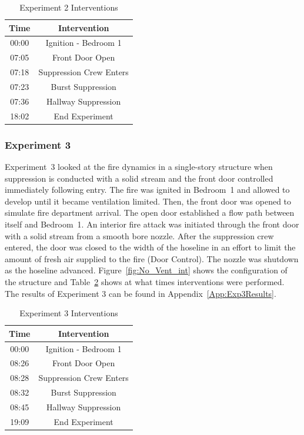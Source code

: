 \documentclass[12pt,oneside]{book}
\begin{document}

\begin{table}[!ht]
	\centering
	\caption{Experiment 2 Interventions}
	\begin{tabular}{|c|c|} 
		\hline
		Time & Intervention \\ \hline \hline
		00:00 & Ignition - Bedroom 1 \\ \hline
		07:05 & Front Door Open \\ \hline
		07:18 & Suppression Crew Enters\\ \hline
		07:23 & Burst Suppression \\ \hline 
		07:36 & Hallway Suppression \\ \hline
		18:02 & End Experiment\\ \hline
	\end{tabular}
	\label{Table:Exp2Interventions}
\end{table}

\FloatBarrier

\subsubsection{Experiment 3}
Experiment~3 looked at the fire dynamics in a single-story structure when suppression is conducted with a solid stream and the front door controlled immediately following entry. The fire was ignited in Bedroom~1 and allowed to develop until it became ventilation limited. Then, the front door was opened to simulate fire department arrival. The open door established a flow path between itself and Bedroom~1. An interior fire attack was initiated through the front door with a solid stream from a smooth bore nozzle. After the suppression crew entered, the door was closed to the width of the hoseline in an effort to limit the amount of fresh air supplied to the fire (Door Control). The nozzle was shutdown as the hoseline advanced. Figure~\ref{fig:No_Vent_int} shows the configuration of the structure and Table~\ref{Table:Exp3Interventions} shows at what times interventions were performed. The results of Experiment 3 can be found in Appendix~\ref{App:Exp3Results}.


\begin{table}[!ht]
	\centering
	\caption{Experiment 3 Interventions}
	\begin{tabular}{|c|c|} 
		\hline
		Time & Intervention \\ \hline \hline
		00:00 & Ignition - Bedroom 1 \\ \hline
		08:26 & Front Door Open \\ \hline
		08:28 & Suppression Crew Enters\\ \hline
		08:32 & Burst Suppression \\ \hline 
		08:45 & Hallway Suppression \\ \hline
		19:09 & End Experiment\\ \hline
	\end{tabular}
	\label{Table:Exp3Interventions}
\end{table}
\end{document}
